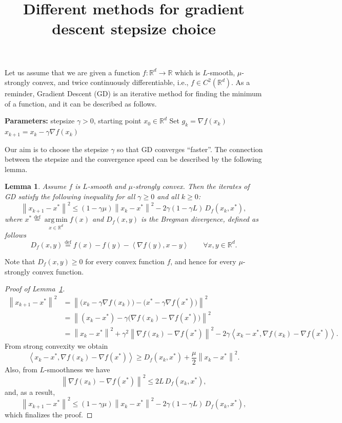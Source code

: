 \documentclass[11pt]{article}
\title{Different methods for gradient descent stepsize choice}
\author{}
\date{}
\newtheorem{lemma}[theorem]{Lemma}
\newcommand{\R}{\mathbb{R}}
\newcommand{\norm}[1]{\left\| #1 \right\|}
\newcommand{\inner}[2]{\left\langle #1, #2 \right\rangle}
\DeclareMathOperator*{\argmin}{arg\,min}
\begin{document}
\maketitle

Let us assume that we are given a function $f\colon \R^d \to \R$ which is $L$-smooth,
$\mu$-strongly convex, and twice continuously differentiable, i.e., $f \in C^2(\R^d)$.
As a reminder, Gradient Descent (GD) is an iterative method for finding the minimum
of a function, and it can be described as follows.

\begin{algorithm}[H]
\caption{GD}
\begin{algorithmic}[1]
\State \textbf{Parameters:} stepsize $\gamma > 0$, starting point $x_0 \in \R^d$
  \State Set $g_k = \nabla f(x_k)$
  \State $x_{k+1} = x_k - \gamma \nabla f(x_k)$
\EndFor
\end{algorithmic}
\end{algorithm}

Our aim is to choose the stepsize $\gamma$ so that GD converges ``faster''.
The connection between the stepsize and the convergence speed can be described by the following lemma.

\begin{lemma}\label{lem:one-step}
Assume $f$ is $L$-smooth and $\mu$-strongly convex. Then the iterates of GD satisfy
the following inequality for all $\gamma \geq 0$ and all $k \geq 0$:
\begin{equation}\label{eq:lemma}
\norm{x_{k+1}-x^*}^2 \leq (1-\gamma\mu)\norm{x_k-x^*}^2 - 2\gamma (1 - \gamma L)\, D_f(x_k, x^*),
\end{equation}
where $x^* \overset{\text{def}}{=} \argmin\limits_{x\in\R^d} f(x)$ and $D_f(x,y)$ is the Bregman
divergence, defined as follows
\[
D_f(x, y) \overset{\text{def}}{=} f(x) - f(y) - \inner{\nabla f(y)}{x - y}
\qquad \forall x, y \in \R^d.
\]
\end{lemma}

Note that $D_f(x,y) \geq 0$ for every convex function $f$, and hence for every
$\mu$-strongly convex function.

\begin{proof}[Proof of Lemma~\ref{lem:one-step}]
\begin{align*}
\norm{x_{k+1}-x^*}^2
&= \norm{\bigl(x_k - \gamma\nabla f(x_k)\bigr)-\bigl(x^* - \gamma\nabla f(x^*)\bigr)}^2 \\
&= \norm{(x_k - x^*) - \gamma\bigl(\nabla f(x_k) -\nabla f(x^*)\bigr)}^2 \\
&= \norm{x_k - x^*}^2 + \gamma^2\norm{\nabla f(x_k) -\nabla f(x^*)}^2
   - 2\gamma\inner{x_k - x^*}{\nabla f(x_k) -\nabla f(x^*)}.
\end{align*}
From strong convexity we obtain
\[
\inner{x_k - x^*}{\nabla f(x_k) -\nabla f(x^*)} \geq D_f(x_k,x^*) + \frac{\mu}{2}\norm{x_k - x^*}^2.
\]
Also, from $L$-smoothness we have
\[
\norm{\nabla f(x_k) -\nabla f(x^*)}^2 \leq 2L\, D_f(x_k,x^*),
\]
and, as a result,
\[
\norm{x_{k+1}-x^*}^2 \leq (1-\gamma\mu)\norm{x_k-x^*}^2 - 2\gamma (1 - \gamma L)\, D_f(x_k, x^*),
\]
which finalizes the proof.
\end{proof}
\end{document}
